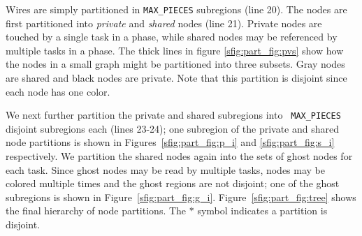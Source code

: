 Wires are simply partitioned in {\tt MAX\_PIECES} subregions (line 20).  
The nodes are first partitioned into 
{\em private} and {\em shared} nodes (line 21).  Private nodes
are touched by a single task in a phase, while shared nodes may
be referenced by multiple tasks in a phase.  The thick lines in figure \ref{sfig:part_fig:pvs}
show how the nodes in a small graph might be partitioned into three subsets.  Gray
nodes are shared and black nodes are private.  Note that
this partition is disjoint since each node has one color.

We next further partition the private and shared subregions into {\tt
MAX\_PIECES} disjoint subregions each (lines 23-24); one subregion of the private and shared node partitions
is shown in Figures~\ref{sfig:part_fig:p_i} and \ref{sfig:part_fig:s_i} respectively.  
We partition the shared nodes again
into the sets of ghost nodes for each task.  Since ghost nodes may be read by multiple tasks,
nodes may be colored multiple times and the ghost regions are not disjoint; one of the ghost subregions is shown in Figure~\ref{sfig:part_fig:g_i}.
Figure~\ref{sfig:part_fig:tree} shows the final hierarchy of node partitions.  The $*$ symbol indicates a partition is 
disjoint.


